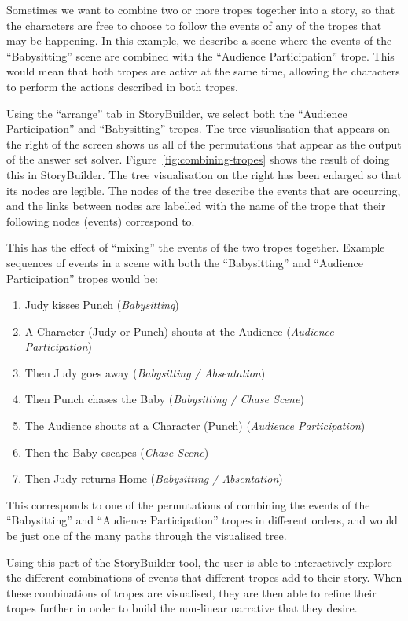 \documentclass[11pt]{report}
\begin{document}
Sometimes we want to combine two or more tropes together into a story, so that
the characters are free to choose to follow the events of any of the tropes that
may be happening. In this example, we describe a scene where the events of the
``Babysitting'' scene are combined with the ``Audience Participation'' trope.
This would mean that both tropes are active at the same time, allowing the
characters to perform the actions described in both tropes.

Using the ``arrange'' tab in StoryBuilder, we select both the ``Audience
Participation'' and ``Babysitting'' tropes. The tree visualisation that appears
on the right of the screen shows us all of the permutations that appear as the
output of the answer set solver. Figure~\ref{fig:combining-tropes} shows the
result of doing this in StoryBuilder. The tree visualisation on the right has
been enlarged so that its nodes are legible. The nodes of the tree describe the
events that are occurring, and the links between nodes are labelled with the
name of the trope that their following nodes (events) correspond to.

This has the effect of ``mixing'' the events of the two tropes together. Example
sequences of events in a scene with both the ``Babysitting'' and ``Audience
Participation'' tropes would be:

\begin{enumerate}
\item Judy kisses Punch (\emph{Babysitting})
\item A Character (Judy or Punch) shouts at the Audience (\emph{Audience Participation})
\item Then Judy goes away (\emph{Babysitting / Absentation})
\item Then Punch chases the Baby (\emph{Babysitting / Chase Scene})
\item The Audience shouts at a Character (Punch) (\emph{Audience Participation})
\item Then the Baby escapes (\emph{Chase Scene})
\item Then Judy returns Home (\emph{Babysitting / Absentation})
\end{enumerate}

This corresponds to one of the permutations of combining the events of the
``Babysitting'' and ``Audience Participation'' tropes in different orders, and
would be just one of the many paths through the visualised tree.

Using this part of the StoryBuilder tool, the user is able to interactively
explore the different combinations of events that different tropes add to their
story. When these combinations of tropes are visualised, they are then able to
refine their tropes further in order to build the non-linear narrative that they desire.
\end{document}
